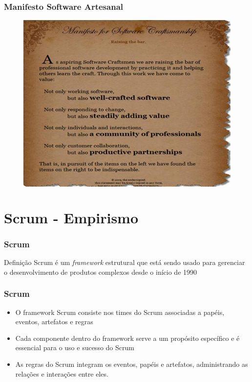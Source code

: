 \begin{frame}
 \frametitle{Manifesto Software Artesanal}
  \begin{figure}
   \centering
   \includegraphics[height = \textheight]{figs/SCManifesto.jpg}
  \end{figure}
\end{frame}

\section{Scrum - Empirismo}
\begin{frame}
 \frametitle{Scrum}
 \begin{block}{Definição}
  Scrum é um \textit{framework} estrutural que está sendo usado para gerenciar o desenvolvimento de
produtos complexos desde o início de 1990
 \end{block}
\end{frame}

 \begin{frame}
 \frametitle{Scrum}
  \begin{itemize}
   \item O framework Scrum consiste nos times do Scrum associadas a papéis, eventos, artefatos e
regras 
\item Cada componente dentro do framework serve a um propósito específico e é essencial
para o uso e sucesso do Scrum
\item As regras do Scrum integram os eventos, papéis e artefatos, administrando as relações e
interações entre eles.
  \end{itemize}
 \end{frame}
 


